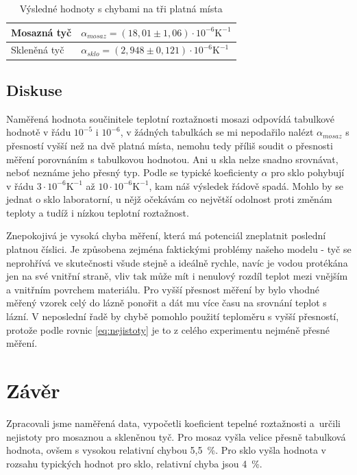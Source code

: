 \documentclass[a4paper,12pt]{article}   %
\begin{document}
\begin{table}[htbp]
  \centering
  \begin{tabular}{|l|l|}
    \hline
    Mosazná tyč & $\alpha_{mosaz} = (18,01 \pm 1,06) \cdot 10^{-6} \text{K}^{-1}$\\\hline
    Skleněná tyč & $\alpha_{sklo} = (2,948 \pm 0,121) \cdot 10^{-6} \text{K}^{-1}$\\\hline
  \end{tabular}
  \caption{Výsledné hodnoty s chybami na tři platná místa}
  \label{tab:final}
\end{table}

\subsection{Diskuse}
\label{ch:diskuze}
Naměřená hodnota součinitele teplotní roztažnosti mosazi odpovídá tabulkové hodnotě v řádu $10^{-5}$ i $10^{-6}$, v žádných tabulkách se mi nepodařilo nalézt $\alpha_{mosaz}$ s přesností vyšší než na dvě platná místa, nemohu tedy příliš soudit o přesnosti měření porovnáním s tabulkovou hodnotou. Ani u skla nelze snadno srovnávat, neboť neznáme jeho přesný typ. Podle \cite{url:sklo} se typické koeficienty $\alpha$ pro sklo pohybují v řádu $3\cdot 10^{-6} \text{K}^{-1}$ až $10 \cdot 10^{-6}\text{K}^{-1}$, kam náš výsledek řádově spadá. Mohlo by se jednat o sklo laboratorní, u nějž očekávám co největší odolnost proti změnám teploty a tudíž i nízkou teplotní roztažnost.

Znepokojivá je vysoká chyba měření, která má potenciál zneplatnit poslední platnou číslici. Je způsobena zejména faktickými problémy našeho modelu - tyč se neprohřívá ve skutečnosti všude stejně a ideálně rychle, navíc je vodou protékána jen na své vnitřní straně, vliv tak může mít i nenulový rozdíl teplot mezi vnějším a vnitřním povrchem materiálu. Pro vyšší přesnost měření by bylo vhodné měřený vzorek celý do lázně ponořit a dát mu více času na srovnání teplot s lázní. V neposlední řadě by chybě pomohlo použití teploměru s vyšší přesností, protože podle rovnic \eqref{eq:nejistoty} je to z celého experimentu nejméně přesné měření.

\section{Závěr}
\label{ch:zaver}
Zpracovali jsme naměřená data, vypočetli koeficient tepelné roztažnosti a~určili nejistoty pro mosaznou a skleněnou tyč. Pro mosaz vyšla velice přesně tabulková hodnota, ovšem s vysokou relativní chybou 5,5~\%. Pro sklo vyšla hodnota v rozsahu typických hodnot pro sklo, relativní chyba jsou 4~\%.
\end{document}
